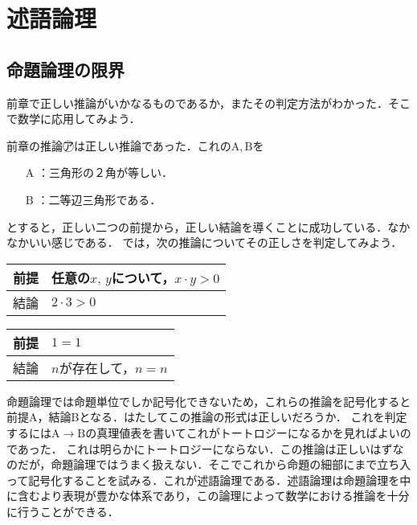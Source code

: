 \documentclass[10pt,b5paper,papersize,dvipdfmx]{jsbook}
\newcommand\rmA{\mathrm{A}}
\newcommand\rmB{\mathrm{B}}
\newcommand\maru[1]{\textcircled{\scriptsize{}#1}}
\begin{document}
\section{述語論理}
\subsection{命題論理の限界}
前章で正しい推論がいかなるものであるか，またその判定方法がわかった．そこで数学に応用してみよう．\par
前章の推論\maru{ア}は正しい推論であった．これの$\rmA, \rmB$を
\begin{itemize}
  \item[$\rmA$]：三角形の２角が等しい．
  \item[$\rmB$]：二等辺三角形である．
\end{itemize}
とすると，正しい二つの前提から，正しい結論を導くことに成功している．なかなかいい感じである．
では，次の推論についてその正しさを判定してみよう．
\begin{table}[H]
  \begin{tabular}{ll}
    前提 & 任意の$x,\, y$について，$x \cdot y>0$ \\ \hline
    結論 & $2 \cdot 3 > 0$\\
  \end{tabular}
\end{table}
\begin{table}[H]
  \begin{tabular}{ll}
    前提 & $1 = 1$ \\ \hline
    結論 & $n$が存在して，$n = n$\\
  \end{tabular}
\end{table}
命題論理では命題単位でしか記号化できないため，これらの推論を記号化すると前提A，結論Bとなる．はたしてこの推論の形式は正しいだろうか．
これを判定するには$\rmA\to\rmB$の真理値表を書いてこれがトートロジーになるかを見ればよいのであった．
これは明らかにトートロジーにならない．この推論は正しいはずなのだが，命題論理ではうまく扱えない．そこでこれから命題の細部にまで立ち入って記号化することを試みる．これが述語論理である．述語論理は命題論理を中に含むより表現が豊かな体系であり，この論理によって数学における推論を十分に行うことができる．
\end{document}
